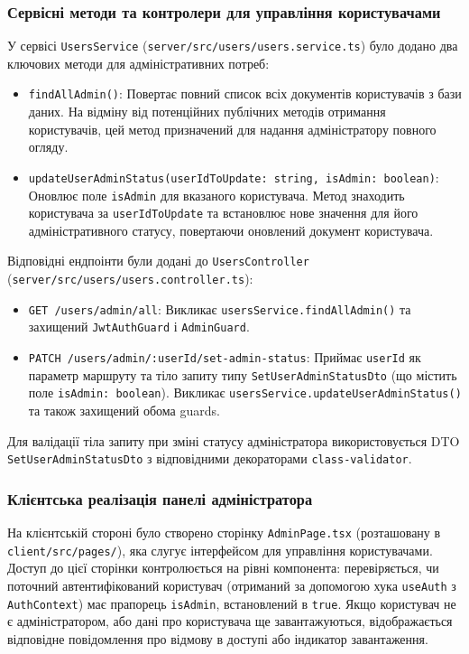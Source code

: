 \subsubsection{Сервісні методи та контролери для управління користувачами}
У сервісі \texttt{UsersService} (\texttt{server/src/users/users.service.ts}) було додано два ключових методи для адміністративних потреб:
\begin{itemize}
    \item \texttt{findAllAdmin()}: Повертає повний список всіх документів користувачів з бази даних. На відміну від потенційних публічних методів отримання користувачів, цей метод призначений для надання адміністратору повного огляду.
    \item \texttt{updateUserAdminStatus(userIdToUpdate: string, isAdmin: boolean)}: Оновлює поле \texttt{isAdmin} для вказаного користувача. Метод знаходить користувача за \texttt{userIdToUpdate} та встановлює нове значення для його адміністративного статусу, повертаючи оновлений документ користувача.
\end{itemize}
Відповідні ендпоінти були додані до \texttt{UsersController} (\texttt{server/src/users/users.controller.ts}):
\begin{itemize}
    \item \texttt{GET /users/admin/all}: Викликає \texttt{usersService.findAllAdmin()} та захищений \texttt{JwtAuthGuard} і \texttt{AdminGuard}.
    \item \texttt{PATCH /users/admin/:userId/set-admin-status}: Приймає \texttt{userId} як параметр маршруту та тіло запиту типу \texttt{SetUserAdminStatusDto} (що містить поле \texttt{isAdmin: boolean}). Викликає \texttt{usersService.updateUserAdminStatus()} та також захищений обома guards.
\end{itemize}
Для валідації тіла запиту при зміні статусу адміністратора використовується DTO \texttt{SetUserAdminStatusDto} з відповідними декораторами \texttt{class-validator}.

\subsubsection{Клієнтська реалізація панелі адміністратора}
На клієнтській стороні було створено сторінку \texttt{AdminPage.tsx} (розташовану в \texttt{client/src/pages/}), яка слугує інтерфейсом для управління користувачами. Доступ до цієї сторінки контролюється на рівні компонента: перевіряється, чи поточний автентифікований користувач (отриманий за допомогою хука \texttt{useAuth} з \texttt{AuthContext}) має прапорець \texttt{isAdmin}, встановлений в \texttt{true}. Якщо користувач не є адміністратором, або дані про користувача ще завантажуються, відображається відповідне повідомлення про відмову в доступі або індикатор завантаження.

